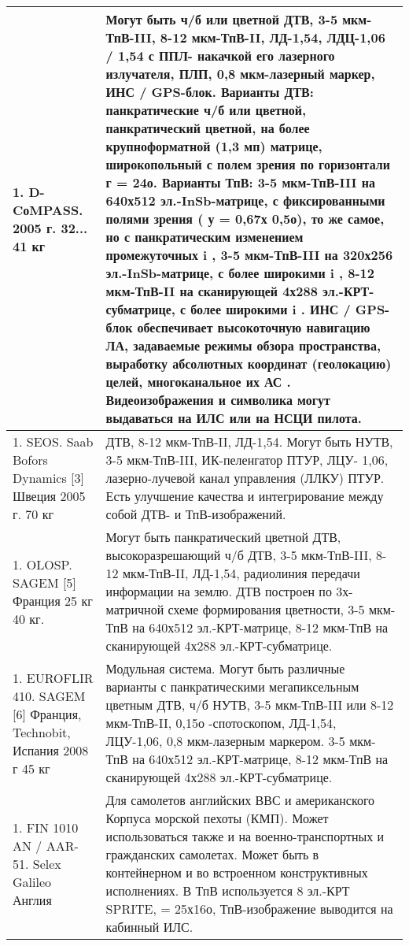 \begin{landscape}
\begin{longtable}{| p{6cm} | p{18cm} |}
\\ \hline
		1.	D-CоMPASS.		2005 г. 	32... 41 кг      
& 
Могут быть ч/б или цветной ДТВ, 3-5 мкм-ТпВ-III, 8-12 мкм-ТпВ-II, ЛД-1,54, ЛДЦ-1,06 / 1,54 с ППЛ- 
накачкой его лазерного излучателя, ПЛП, 0,8 мкм-лазерный маркер, ИНС / GPS-блок. 
Варианты ДТВ: 
панкратические ч/б или цветной,  панкратический цветной, на более крупноформатной (1,3 мп) матрице,  широкопольный с полем зрения по горизонтали г = 24о. 
Варианты ТпВ: 
3-5 мкм-ТпВ-III на 640х512 эл.-InSb-матрице, с фиксированными полями зрения ( у = 0,67х 0,5о),  то же самое, но с панкратическим изменением промежуточных i ,  3-5 мкм-ТпВ-III на 320х256 эл.-InSb-матрице, с более широкими i ,  8-12 мкм-ТпВ-II на сканирующей 4х288 эл.-КРТ-субматрице, с более широкими i . 
ИНС / GPS-блок обеспечивает высокоточную навигацию ЛА, задаваемые режимы обзора пространства, выработку абсолютных координат (геолокацию) целей, многоканальное их АС 
. Видеоизображения и символика могут выдаваться на ИЛС или на НСЦИ пилота. 
    
\\ \hline
	1.	SEOS. Saab Bofors Dynamics
	[3]
	Швеция	2005 г. 	70 кг
	      
& 
ДТВ, 8-12 мкм-ТпВ-II, ЛД-1,54. Могут быть НУТВ, 3-5 мкм-ТпВ-III, ИК-пеленгатор ПТУР, ЛЦУ-
1,06, лазерно-лучевой канал управления (ЛЛКУ) ПТУР.
Есть улучшение качества и интегрирование между собой ДТВ- и ТпВ-изображений.
   
\\ \hline
		1.	OLOSP. SAGEM
		[5]
		Франция		25 кг 
		40 кг. 
		       
& 
Могут быть панкратический цветной ДТВ, высокоразрешающий ч/б ДТВ, 3-5 мкм-ТпВ-III, 8-12 мкм-ТпВ-II, ЛД-1,54, радиолиния передачи информации на землю. 
ДТВ построен по 3х-матричной схеме формирования цветности, 3-5 мкм-ТпВ на 640х512 эл.-КРТ-матрице, 8-12 мкм-ТпВ на сканирующей 4х288 эл.-КРТ-субматрице. 
   
\\ \hline
		1.	EUROFLIR 410. SAGEM
		[6]
		Франция, Technobit, Испания	2008 г	45 кг
		       
& 
Модульная система. Могут быть различные варианты с панкратическими мегапиксельным цветным 
ДТВ, ч/б НУТВ, 3-5 мкм-ТпВ-III или 8-12 мкм-ТпВ-II, 0,15о
-спотоскопом, ЛД-1,54, ЛЦУ-1,06, 0,8 мкм-лазерным маркером. 3-5 мкм-ТпВ на 640х512 эл.-КРТ-матрице, 8-12 мкм-ТпВ на сканирующей 4х288 эл.-КРТ-субматрице.
   
\\ \hline
		1.	FIN 1010 AN / AAR-51. Selex Galileo	Англия		     
& 
Для самолетов английских ВВС и американского Корпуса морской пехоты (КМП). Может использоваться также и на военно-транспортных и гражданских самолетах. Может быть в контейнерном и во встроенном конструктивных исполнениях. 
В ТпВ используется 8 эл.-КРТ SPRITE, = 25х16о, ТпВ-изображение выводится на кабинный ИЛС. 
   

\end{longtable}
\end{landscape}
